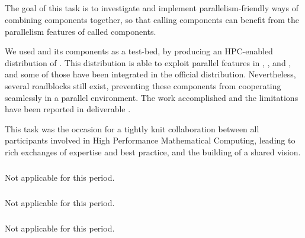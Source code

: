   \subparagraph{}
  \label{component-architecture@component-for-HPC}
  The goal of this task is to investigate and implement
  parallelism-friendly ways of combining components together, so that
  calling components can benefit from the parallelism features of
  called components.

  We used \Sage and its components as a test-bed, by producing an
  HPC-enabled distribution of \Sage. This distribution is able to
  exploit parallel features in \Linbox, \GAP, \Singular and \PariGP,
  and some of those have been integrated in the official \Sage
  distribution. Nevertheless, several roadblocks still exist,
  preventing these components from cooperating seamlessly in a
  parallel environment. The work accomplished and the limitations have
  been reported in deliverable  
  .

  This task was the occasion for a tightly knit collaboration between
  all \ODK participants involved in High Performance Mathematical
  Computing, leading to rich exchanges of expertise and best practice,
  and the building of a shared vision.
  
  \subparagraph{}
  \label{component-architecture@extract-smc}
  Not applicable for this period.
  
  \subparagraph{}
  \label{component-architecture@workflow}
  Not applicable for this period.
  
  \subparagraph{}
  \label{component-architecture@oommf-python-interface}
  Not applicable for this period.

  

